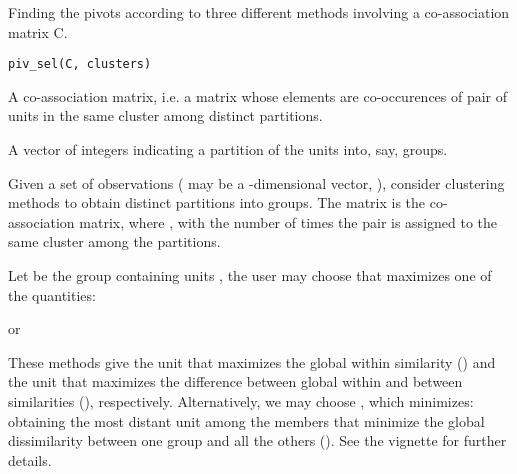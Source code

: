 \documentclass[a4paper]{book}
\begin{document}
%
\begin{Description}\relax
Finding the pivots according to three different
methods involving a co-association matrix C.
\end{Description}
%
\begin{Usage}
\begin{verbatim}
piv_sel(C, clusters)
\end{verbatim}
\end{Usage}
%
\begin{Arguments}
\begin{ldescription}
\item[\code{C}] A  co-association matrix, i.e.
a matrix whose elements are co-occurences of pair of units
in the same cluster among  distinct partitions.

\item[\code{clusters}] A vector of integers indicating
a partition of the  units into, say,  groups.
\end{ldescription}
\end{Arguments}
%
\begin{Details}\relax
Given a set of  observations 
( may be a -dimensional vector, ),
consider clustering methods to obtain  distinct partitions
into  groups.
The matrix  is the co-association matrix,
where , with  the number of times
the pair  is assigned to the same
cluster among the  partitions.

Let  be the group containing units ,
the user may choose  that
maximizes one of the quantities:

or

These methods give the unit that maximizes the global
within similarity () and the unit that
maximizes the difference between global within and
between similarities (), respectively.
Alternatively, we may choose , which minimizes:
obtaining the most distant unit among the members
that minimize the global dissimilarity between one group
and all the others ().
See the vignette for further details.
\end{Details}
\end{document}
